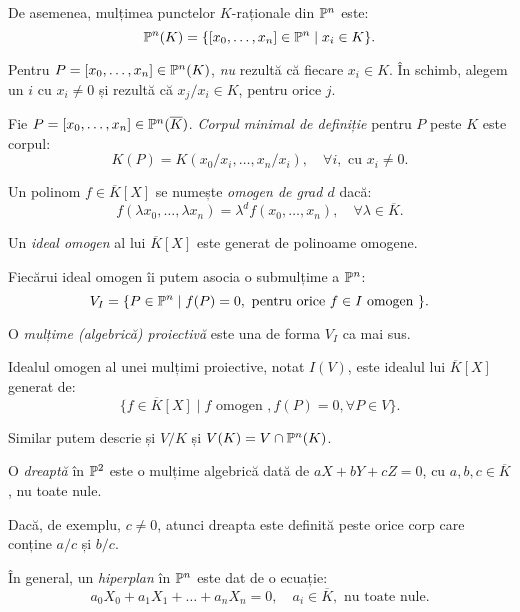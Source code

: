 De asemenea, mulțimea punctelor $ K $-raționale din $ \mathbb{P}^n $ este:
\[
  \mathbb{P}^n(K) = \{ [x_0, \dots, x_n] \in \mathbb{P}^n \mid x_i \in K \}.
\]

\begin{remark}\label{rk:proj}
  Pentru $ P = [x_0, \dots, x_n] \in \mathbb{P}^n(K) $, \emph{nu} rezultă că fiecare $ x_i \in K $.
  În schimb, alegem un $ i $ cu $ x_i \neq 0 $ și rezultă că $ x_j / x_i \in K $, pentru
  orice $ j $.
\end{remark}

\begin{definition}\label{def:corp-minimal}
  Fie $ P = [ x_0, \dots, x_n ] \in \mathbb{P}^n(\overline{K}) $. \emph{Corpul minimal de definiție}
  pentru $ P $ peste $ K $ este corpul:
  \[
    K(P) = K(x_0/x_i, \dots, x_n/x_i), \quad \forall i, \text{ cu } x_i \neq 0.
  \]
\end{definition}

\begin{definition}\label{def:polinom-omogen}
  Un polinom $ f \in \overline{K}[X] $ se numește \emph{omogen de grad $ d $} dacă:
  \[
    f(\lambda x_0, \dots, \lambda x_n) = \lambda^d f(x_0, \dots, x_n), %
    \quad \forall \lambda \in \overline{K}.
  \]

  Un \emph{ideal omogen} al lui $ \overline{K}[X] $ este generat de polinoame omogene.
\end{definition}

Fiecărui ideal omogen îi putem asocia o submulțime a $ \mathbb{P}^n $:
\[
  V_I = \{ P \in \mathbb{P}^n \mid f(P) = 0, \text{ pentru orice } f \in I \text{ omogen } \}.
\]

\begin{definition}\label{def:multime-proiectiva}
  O \emph{mulțime (algebrică) proiectivă} este una de forma $ V_I $ ca mai sus.

  Idealul omogen al unei mulțimi proiective, notat $ I(V) $, este idealul lui
  $ \overline{K}[X] $ generat de:
  \[
    \{ f \in \overline{K}[X] \mid f \text{ omogen }, f(P) = 0, \forall P \in V \}.
  \]
\end{definition}

Similar putem descrie și $ V/K $ și $ V(K) = V \cap \mathbb{P}^n(K) $.

\begin{example}\label{exm:dreapta-proj}
  O \emph{dreaptă} în $ \mathbb{P}^2 $ este o mulțime algebrică dată de
  $ aX + bY + cZ = 0 $, cu $ a, b, c \in \overline{K} $, nu toate nule.

  Dacă, de exemplu, $ c \neq 0 $, atunci dreapta este definită peste orice corp
  care conține $ a/c $ și $ b/c $.

  În general, un \emph{hiperplan} în $ \mathbb{P}^n $ este dat de o ecuație:
  \[
    a_0 X_0 + a_1 X_1 + \dots + a_n X_n = 0, %
    \quad a_i \in \overline{K}, \text{ nu toate nule}.
  \]
\end{example}

